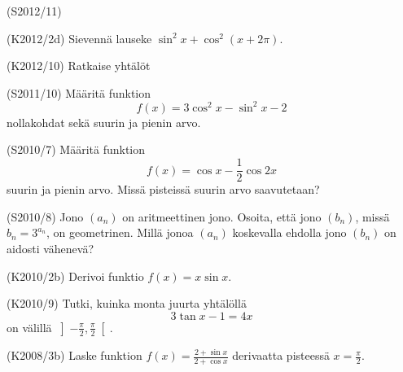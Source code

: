\begin{tehtava} (S2012/11)
	\begin{alakohdat}
	\end{alakohdat}
\end{tehtava}

\begin{tehtava} (K2012/2d)
	Sievennä lauseke $\sin^2x+\cos^2(x+2\pi)$.
\end{tehtava}

\begin{tehtava} (K2012/10)
	Ratkaise yhtälöt
	\begin{alakohdat}
		\alakohta{$3\tan\frac{x}{2}+3=0$}
		\alakohta{$2\sin^2x+3\cos x-3=0$}
	\end{alakohdat}
\end{tehtava}

\begin{tehtava} (S2011/10)
	Määritä funktion \[f(x)=3\cos^2x-\sin^2x-2\] nollakohdat sekä suurin ja pienin arvo.
\end{tehtava}

\begin{tehtava} (S2010/7)
	Määritä funktion \[f(x)=\cos x-\frac{1}{2}\cos 2x\] suurin ja pienin arvo. Missä pisteissä suurin 
	arvo saavutetaan?
\end{tehtava}

\begin{tehtava} (S2010/8)
	Jono $(a_n)$ on aritmeettinen jono. Osoita, että jono $(b_n)$, missä $b_n=3^{a_n}$, on geometrinen. 
	Millä jonoa $(a_n)$ koskevalla ehdolla jono $(b_n)$ on aidosti vähenevä?
\end{tehtava}

\begin{tehtava} (K2010/2b)
	Derivoi funktio $f(x)=x\sin x$.
\end{tehtava}

\begin{tehtava} (K2010/9)
	Tutki, kuinka monta juurta yhtälöllä \[3\tan x-1=4x\] on välillä 
	$\left]-\frac{\pi}{2},\frac{\pi}{2}\right[$.
\end{tehtava}

\begin{tehtava} (K2008/3b)
	Laske funktion $f(x)=\frac{2+\sin x}{2+\cos x}$ derivaatta pisteessä $x=\frac{\pi}{2}$.
\end{tehtava}

